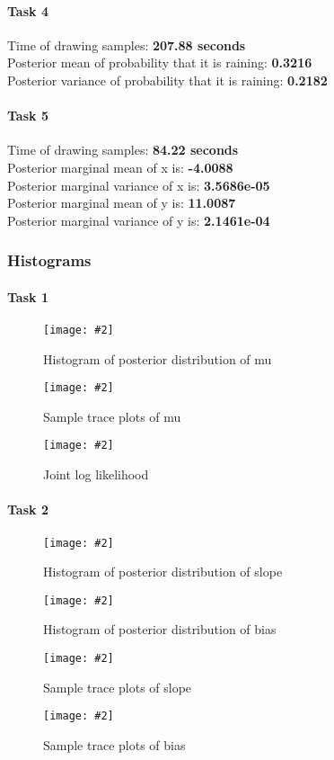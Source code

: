 \documentclass{article}
\newcommand{\centerfigcap}[3]{\begin{figure}[H]
\begin{center}\texttt{[image: \#2]} \caption{#3}\end{center}
\end{figure}}
\begin{document}
\paragraph{Task 4}
Time of drawing samples: \textbf{207.88 seconds}\\
Posterior mean of probability that it is raining: \textbf{0.3216}\\
Posterior variance of probability that it is raining: \textbf{0.2182}
\paragraph{Task 5}
Time of drawing samples: \textbf{84.22 seconds}\\
Posterior marginal mean of x is: \textbf{-4.0088}\\
Posterior marginal variance of x is: \textbf{3.5686e-05}\\
Posterior marginal mean of y is: \textbf{11.0087}\\
Posterior marginal variance of y is: \textbf{2.1461e-04}
\subsubsection{Histograms}
\paragraph{Task 1}
\centerfigcap{0.7}{../figures/MH_within_Gibbs_plt_hist_program_1_d_0}{Histogram of posterior distribution of mu}
\centerfigcap{0.8}{../figures/MH_within_Gibbs_plt_trace_program_1_d_0}{Sample trace plots of mu}
\centerfigcap{0.8}{../figures/MH_within_Gibbs_plt_log_joint_program_1}{Joint log likelihood}
\paragraph{Task 2}

\begin{minipage}{.5\textwidth}
  \centering
  \centerfigcap{1}{../figures/MH_within_Gibbs_plt_hist_program_2_d_0}{Histogram of posterior distribution of slope}
\end{minipage}%
\begin{minipage}{.5\textwidth}
  \centering
  \centerfigcap{1}{../figures/MH_within_Gibbs_plt_hist_program_2_d_1}{Histogram of posterior distribution of bias}
\end{minipage}

\begin{minipage}{.5\textwidth}
  \centering
  \centerfigcap{1}{../figures/MH_within_Gibbs_plt_trace_program_2_d_0}{Sample trace plots of slope}
\end{minipage}%
\begin{minipage}{.5\textwidth}
  \centering
  \centerfigcap{1}{../figures/MH_within_Gibbs_plt_trace_program_2_d_1}{Sample trace plots of bias}
\end{minipage}
\end{document}
